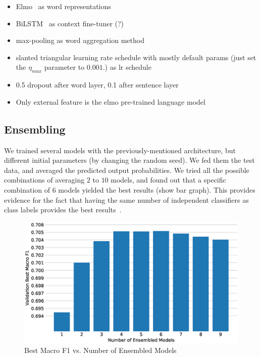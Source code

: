 \documentclass[11pt,a4paper]{article}
\begin{document}
\begin{itemize}
    \item Elmo~\cite{peters2018deep} as word representations
    \item BiLSTM~\cite{graves2005framewise, graves2013speech} as context fine-tuner (?)
    \item max-pooling as word aggregation method
    \item slanted triangular learning rate schedule with mostly default params
        (just set the $\eta_{max}$ parameter to $0.001$.)
        as lr schedule~\cite{howard2018universal}
    \item 0.5 dropout after word layer, 0.1 after sentence layer~\cite{srivastava2014dropout}
    \item Only external feature is the elmo pre-trained language model
\end{itemize}

\subsection{Ensembling}

We trained several models with the previously-mentioned architecture, but
different initial parameters (by changing the random seed). We fed them the test
data, and averaged the predicted output probabilities. We tried all the possible
combinations of averaging $2$ to $10$ models, and found out that a specific
combination of $6$ models yielded the best results (show bar graph). This
provides evidence for the fact that having the same number of independent
classifiers as class labels provides the best results~\cite{bonab2016theoretical}.

\begin{figure}
    \centering
    \includegraphics[width=\columnwidth]{images/best_ensembles.eps}
\caption{Best Macro F1 vs. Number of Ensembled Models}
\label{fig:}
\end{figure}
\end{document}
